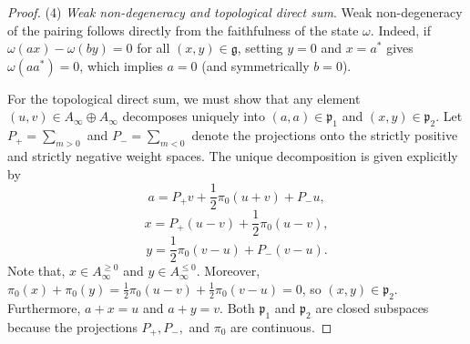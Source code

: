 \documentclass[10pt,a4paper]{amsart}
\begin{document}
\begin{proof}
(4) \textit{Weak non-degeneracy and topological direct sum}. Weak non-degeneracy of the pairing follows directly from the faithfulness of the state $\omega$. Indeed, if $\omega(ax) - \omega(by) = 0$ for all $(x, y) \in \mathfrak{g}$, setting $y=0$ and $x=a^*$ gives $\omega(aa^*) = 0$, which implies $a=0$ (and symmetrically $b=0$). 

For the topological direct sum, we must show that any element $(u, v) \in A_{\infty} \oplus A_{\infty}$ decomposes uniquely into $(a, a) \in \mathfrak{p}_1$ and $(x, y) \in \mathfrak{p}_2$. Let $P_+ = \sum_{m > 0}$ and $P_- = \sum_{m < 0}$ denote the projections onto the strictly positive and strictly negative weight spaces. The unique decomposition is given explicitly by
\[
a = P_+ v + \frac{1}{2}\pi_0(u+v) + P_- u,
\]
\[
x = P_+ (u-v) + \frac{1}{2}\pi_0(u-v),
\]
\[
y = \frac{1}{2}\pi_0(v-u) + P_- (v-u).
\]
Note that, $x \in A_{\infty}^{\ge 0}$ and $y \in A_{\infty}^{\le 0}$. Moreover, $\pi_0(x) + \pi_0(y) = \frac{1}{2}\pi_0(u-v) + \frac{1}{2}\pi_0(v-u) = 0$, so $(x,y) \in \mathfrak{p}_2$. Furthermore, $a + x = u$ and $a + y = v$. Both $\mathfrak{p}_1$ and $\mathfrak{p}_2$ are closed subspaces because the projections $P_+, P_-,$ and $\pi_0$ are continuous.
\end{proof}
\end{document}
